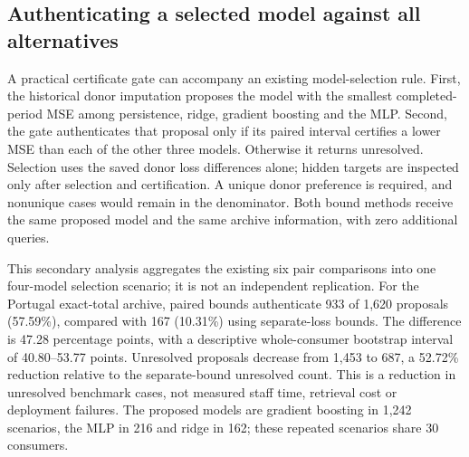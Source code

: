 \subsection{Authenticating a selected model against all alternatives}
\label{sec:practical-model-selection}
A practical certificate gate can accompany an existing model-selection
rule. First, the historical donor imputation proposes the model with the
smallest completed-period MSE among persistence, ridge, gradient boosting
and the MLP. Second, the gate authenticates that proposal only if its
paired interval certifies a lower MSE than each of the other three models.
Otherwise it returns unresolved. Selection uses the saved donor loss
differences alone; hidden targets are inspected only after selection and
certification. A unique donor preference is required, and nonunique cases
would remain in the denominator. Both bound methods receive the same
proposed model and the same archive information, with zero additional
queries.

This secondary analysis aggregates the existing six pair comparisons into
one four-model selection scenario; it is not an independent replication.
For the Portugal exact-total archive, paired bounds authenticate 933 of
1,620 proposals (57.59\%), compared with 167 (10.31\%) using separate-loss
bounds. The difference is 47.28 percentage points, with a descriptive
whole-consumer bootstrap interval of 40.80--53.77 points. Unresolved
proposals decrease from 1,453 to 687, a 52.72\% reduction relative to the
separate-bound unresolved count. This is a reduction in unresolved
benchmark cases, not measured staff time, retrieval cost or deployment
failures. The proposed models are gradient boosting in 1,242 scenarios,
the MLP in 216 and ridge in 162; these repeated scenarios share 30 consumers.

